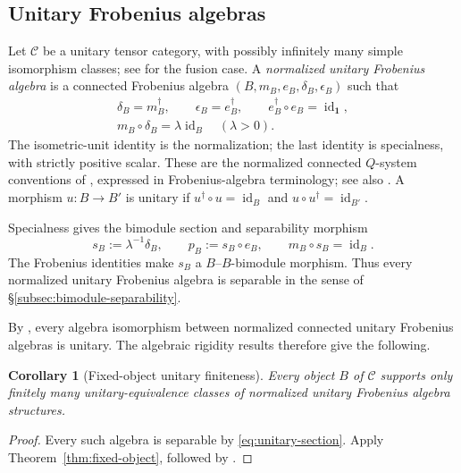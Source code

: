 \documentclass[11pt]{amsart}
\newtheorem{corollary}[theorem]{Corollary}
\theoremstyle{definition}
\theoremstyle{remark}
\newcommand{\C}{\mathcal C}
\newcommand{\one}{\mathbf 1}
\DeclareMathOperator{\id}{id}
\begin{document}
\subsection{Unitary Frobenius algebras}\label{sec:unitary-frobenius}

Let $\C$ be a unitary tensor category, with possibly infinitely many
simple isomorphism classes; see \cite[Remark~9.4.7]{EGNO} for the fusion
case.  A \emph{normalized unitary Frobenius algebra}
is a connected Frobenius algebra
$(B,m_B,e_B,\delta_B,\epsilon_B)$ such that
\[
\begin{gathered}
  \delta_B=m_B^\dagger,\qquad \epsilon_B=e_B^\dagger,\qquad
  e_B^\dagger\circ e_B=\id_{\one},\\
  m_B\circ\delta_B=\lambda\id_B\quad(\lambda>0).
\end{gathered}
\]
The isometric-unit identity is the normalization; the last identity is
specialness, with strictly positive scalar.  These are the normalized
connected $Q$-system conventions of
\cite[Definitions~2.12 and~2.16--2.17]{CGGH}, expressed
in Frobenius-algebra terminology; see also
\cite{Longo,BKLR,JonesPenneys,JonesPenneysQ}.  A morphism
$u:B\to B'$ is unitary if $u^\dagger\circ u=\id_B$ and
$u\circ u^\dagger=\id_{B'}$.

Specialness gives the bimodule section and separability morphism
\begin{equation}\label{eq:unitary-section}
  s_B:=\lambda^{-1}\delta_B,\qquad
  p_B:=s_B\circ e_B,\qquad
  m_B\circ s_B=\id_B.
\end{equation}
The Frobenius identities make $s_B$ a $B$--$B$-bimodule morphism.  Thus
every normalized unitary Frobenius algebra is separable in the sense of
\S{}\ref{subsec:bimodule-separability}.

By \cite[Theorem~3.9]{CGGH}, every algebra isomorphism between normalized
connected unitary Frobenius algebras is unitary.  The algebraic rigidity
results therefore give the following.

\begin{corollary}[Fixed-object unitary finiteness]
\label{cor:fixed-unitary-frobenius}
Every object $B$ of $\C$ supports only finitely many unitary-equivalence
classes of normalized unitary Frobenius algebra structures.
\end{corollary}

\begin{proof}
Every such algebra is separable by \eqref{eq:unitary-section}.  Apply
Theorem~\ref{thm:fixed-object}, followed by
\cite[Theorem~3.9]{CGGH}.
\end{proof}
\end{document}
